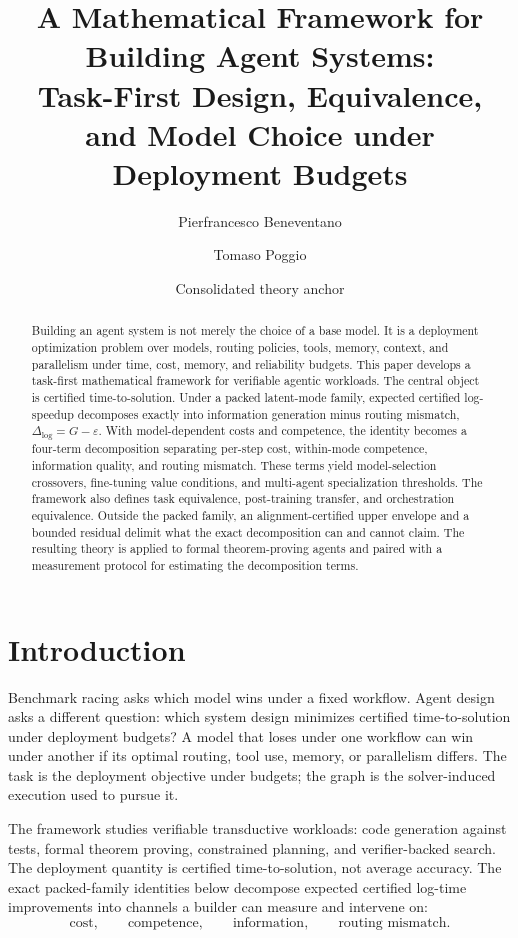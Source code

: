 \documentclass[10pt]{article}
\title{A Mathematical Framework for Building Agent Systems:\\
Task-First Design, Equivalence, and Model Choice under Deployment Budgets}
\author{Pierfrancesco Beneventano \and Tomaso Poggio}
\date{Consolidated theory anchor}
\theoremstyle{paperplain}
\theoremstyle{paperdefinition}
\theoremstyle{paperremark}
\newcommand{\Dlog}{\Delta_{\log}}
\begin{document}
\maketitle

\begin{abstract}
Building an agent system is not merely the choice of a base model. It is a deployment optimization problem over models, routing policies, tools, memory, context, and parallelism under time, cost, memory, and reliability budgets. This paper develops a task-first mathematical framework for verifiable agentic workloads. The central object is certified time-to-solution. Under a packed latent-mode family, expected certified log-speedup decomposes exactly into information generation minus routing mismatch, $\Dlog=G-\varepsilon$. With model-dependent costs and competence, the identity becomes a four-term decomposition separating per-step cost, within-mode competence, information quality, and routing mismatch. These terms yield model-selection crossovers, fine-tuning value conditions, and multi-agent specialization thresholds. The framework also defines task equivalence, post-training transfer, and orchestration equivalence. Outside the packed family, an alignment-certified upper envelope and a bounded residual delimit what the exact decomposition can and cannot claim. The resulting theory is applied to formal theorem-proving agents and paired with a measurement protocol for estimating the decomposition terms.
\end{abstract}

\section{Introduction}
\label{sec:intro}

Benchmark racing asks which model wins under a fixed workflow. Agent design asks a different question: which system design minimizes certified time-to-solution under deployment budgets? A model that loses under one workflow can win under another if its optimal routing, tool use, memory, or parallelism differs. The task is the deployment objective under budgets; the graph is the solver-induced execution used to pursue it.

The framework studies verifiable transductive workloads: code generation against tests, formal theorem proving, constrained planning, and verifier-backed search. The deployment quantity is certified time-to-solution, not average accuracy. The exact packed-family identities below decompose expected certified log-time improvements into channels a builder can measure and intervene on:
\[
\text{cost},\qquad \text{competence},\qquad \text{information},\qquad \text{routing mismatch}.
\]
\end{document}
